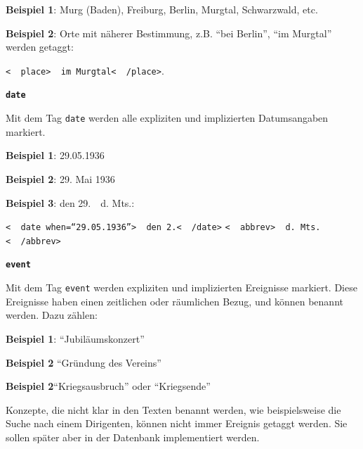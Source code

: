 \documentclass[12pt, a4paper, ngerman, bidi=default]{article}
\begin{document}
\begin{description}
    \noindent \textbf{ Beispiel 1}: Murg (Baden), Freiburg, Berlin, Murgtal, Schwarzwald, etc.

    \textbf{ Beispiel 2}: Orte mit näherer Bestimmung, z.B. \enquote{bei Berlin}, \enquote{im Murgtal} werden getaggt:  

    \colorbox{VeryLightGray}{\texttt{\textless\ \  place\textgreater\ \  im Murgtal\textless\ \  /place\textgreater}.} 

    
    \item\texttt{\textbf{{\colorbox{date}{date}}}}
        
    Mit dem Tag \texttt{\colorbox{date}{date}} werden alle expliziten und implizierten Datumsangaben markiert.  
    
    \noindent \textbf{ Beispiel 1}:  29.05.1936

    \textbf{ Beispiel 2}: 29. Mai 1936

    \textbf{ Beispiel 3}: den 29.\ \  d. Mts.:

    \colorbox{VeryLightGray}{\texttt{\textless\ \  date when=\enquote{29.05.1936}\textgreater\ \  den 2.\textless\ \  /date\textgreater} \texttt{\textless\ \  abbrev\textgreater\ \  d. Mts.\textless\ \  /abbrev\textgreater}}

    \item\texttt{\textbf{{\colorbox{eventTag}{event}}}}
    
    Mit dem Tag \texttt{\colorbox{eventTag}{event}} werden expliziten und implizierten Ereignisse markiert. Diese Ereignisse haben einen zeitlichen oder räumlichen Bezug, und können benannt werden. Dazu zählen:

    \noindent \textbf{ Beispiel 1}: \enquote{Jubiläumskonzert}

    \textbf{ Beispiel 2} \enquote{Gründung des Vereins} 

    \textbf{ Beispiel 2}\enquote{Kriegsausbruch} oder \enquote{Kriegsende}

    Konzepte, die nicht klar in den Texten benannt werden, wie beispielsweise die Suche nach einem Dirigenten, können nicht immer Ereignis getaggt werden. Sie sollen später aber in der Datenbank implementiert werden.
    \end{description}
    
\end{document}
